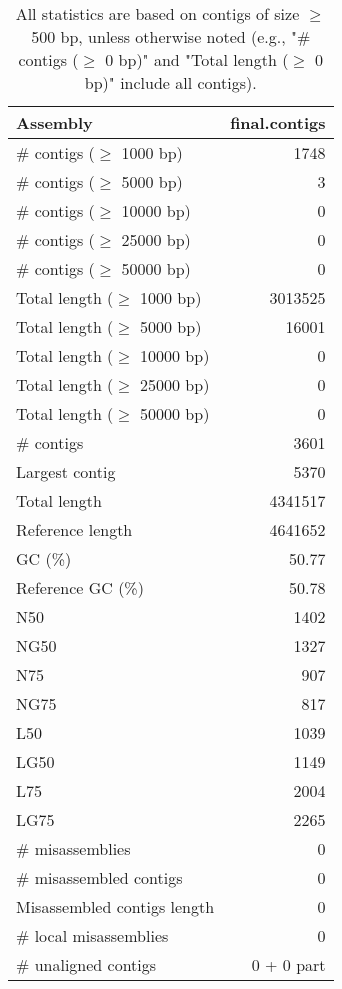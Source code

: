 \documentclass[12pt,a4paper]{article}
\begin{document}
\begin{table}[ht]
\begin{center}
\caption{All statistics are based on contigs of size $\geq$ 500 bp, unless otherwise noted (e.g., "\# contigs ($\geq$ 0 bp)" and "Total length ($\geq$ 0 bp)" include all contigs).}
\begin{tabular}{|l*{1}{|r}|}
\hline
Assembly & final.contigs \\ \hline
\# contigs ($\geq$ 1000 bp) & 1748 \\ \hline
\# contigs ($\geq$ 5000 bp) & 3 \\ \hline
\# contigs ($\geq$ 10000 bp) & 0 \\ \hline
\# contigs ($\geq$ 25000 bp) & 0 \\ \hline
\# contigs ($\geq$ 50000 bp) & 0 \\ \hline
Total length ($\geq$ 1000 bp) & 3013525 \\ \hline
Total length ($\geq$ 5000 bp) & 16001 \\ \hline
Total length ($\geq$ 10000 bp) & 0 \\ \hline
Total length ($\geq$ 25000 bp) & 0 \\ \hline
Total length ($\geq$ 50000 bp) & 0 \\ \hline
\# contigs & 3601 \\ \hline
Largest contig & 5370 \\ \hline
Total length & 4341517 \\ \hline
Reference length & 4641652 \\ \hline
GC (\%) & 50.77 \\ \hline
Reference GC (\%) & 50.78 \\ \hline
N50 & 1402 \\ \hline
NG50 & 1327 \\ \hline
N75 & 907 \\ \hline
NG75 & 817 \\ \hline
L50 & 1039 \\ \hline
LG50 & 1149 \\ \hline
L75 & 2004 \\ \hline
LG75 & 2265 \\ \hline
\# misassemblies & 0 \\ \hline
\# misassembled contigs & 0 \\ \hline
Misassembled contigs length & 0 \\ \hline
\# local misassemblies & 0 \\ \hline
\# unaligned contigs & 0 + 0 part \\ \hline

\end{tabular}
\end{center}
\end{table}
\end{document}
